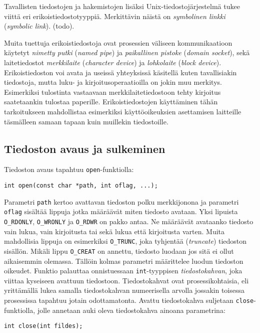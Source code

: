 Tavallisten tiedostojen ja hakemistojen lisäksi Unix-tiedostojärjestelmä tukee viittä eri erikoistiedostotyyppiä.
Merkittävin näistä on \emph{symbolinen linkki} (\emph{symbolic link}). (todo).

Muita tuettuja erikoistiedostoja ovat prosessien väliseen kommunikaatioon käytetyt \emph{nimetty putki} (\emph{named pipe}) ja \emph{paikallinen pistoke} (\emph{domain socket}),
sekä laitetiedostot \emph{merkkilaite} (\emph{character device}) ja \emph{lohkolaite} (\emph{block device}).
Erikoistiedoston voi avata ja useissä yhteyksissä käsitellä kuten tavallisiakin tiedostoja,
mutta luku- ja kirjoitusoperaatioilla on jokin muu merkitys.
Esimerkiksi tulostinta vastaavaan merkkilaitetiedostoon tehty kirjoitus saatetaankin tulostaa paperille.
Erikoistiedostojen käyttäminen tähän tarkoitukseen mahdollistaa esimerkiksi käyttöoikeuksien asettamisen laitteille täsmälleen samaan tapaan kuin muillekin tiedostoille.

\subsection{Tiedoston avaus ja sulkeminen}
Tiedoston avaus tapahtuu \texttt{open}-funktiolla:

\begin{verbatim}
int open(const char *path, int oflag, ...);
\end{verbatim}
%
Parametri \texttt{path} kertoo avattavan tiedoston polku merkkijonona
ja parametri \texttt{oflag} sisältää lippuja jotka määräävät miten tiedosto avataan.
Yksi lipuista \texttt{O\_RDONLY}, \texttt{O\_WRONLY} ja \texttt{O\_RDWR} on pakko antaa.
Ne määräävät avataanko tiedosto vain lukua, vain kirjoitusta tai sekä lukua että
kirjoitusta varten.
Muita mahdollisia lippuja on esimerkiksi \texttt{O\_TRUNC},
joka tyhjentää (\emph{truncate}) tiedoston sisällön.
Mikäli lippu \texttt{O\_CREAT} on annettu,
tiedosto luodaan jos sitä ei ollut aikaisemmin olemassa.
Tällöin kolmas parametri määrittelee luodun tiedoston oikeudet.
Funktio palauttaa onnistuessaan \texttt{int}-tyyppisen \emph{tiedostokahvan},
joka viittaa kyseiseen avattuun tiedostoon.
Tiedostokahvat ovat prosessikohtaisia,
eli yrittämällä lukea samalla tiedostokahvan numeerisella arvolla
jossakin toisessa prosessissa tapahtuu jotain odottamatonta.
Avattu tiedostokahva suljetaan \texttt{close}-funktiolla,
jolle annetaan auki oleva tiedostokahva ainoana parametrina:

\begin{verbatim}
int close(int fildes);
\end{verbatim}

